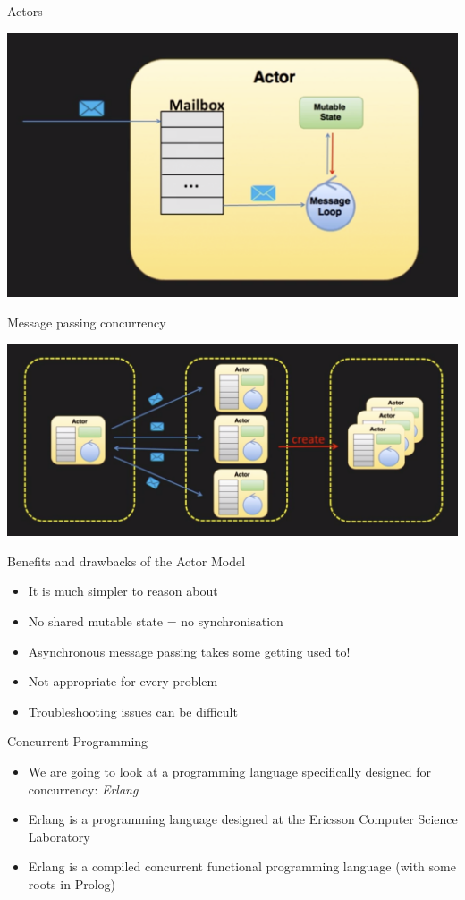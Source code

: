 \documentclass[12pt,xcolor=svgnames]{beamer}
\begin{document}
\begin{frame}{Actors}
\centerline{\includegraphics[width=1\textwidth]{images/actor}}		
\end{frame}

\begin{frame}{Message passing concurrency}
\centerline{\includegraphics[width=1\textwidth]{images/message-passing}}		
\end{frame}

\begin{frame}{Benefits and drawbacks of the Actor Model}
\begin{itemize}
\item It is much simpler to reason about
\item No shared mutable state = 	no synchronisation
\item Asynchronous message passing takes some getting used to!
\item Not appropriate for every problem
\item Troubleshooting issues can be difficult
\end{itemize}
	
\end{frame}


\begin{frame}{Concurrent Programming}
\begin{itemize}
\item We are going to look at a programming language specifically designed for concurrency: \emph{Erlang}
\item Erlang is a programming language designed at the Ericsson Computer Science Laboratory
\item Erlang is a compiled concurrent functional programming language (with some roots in Prolog)
\end{itemize}
\end{frame}
\end{document}
